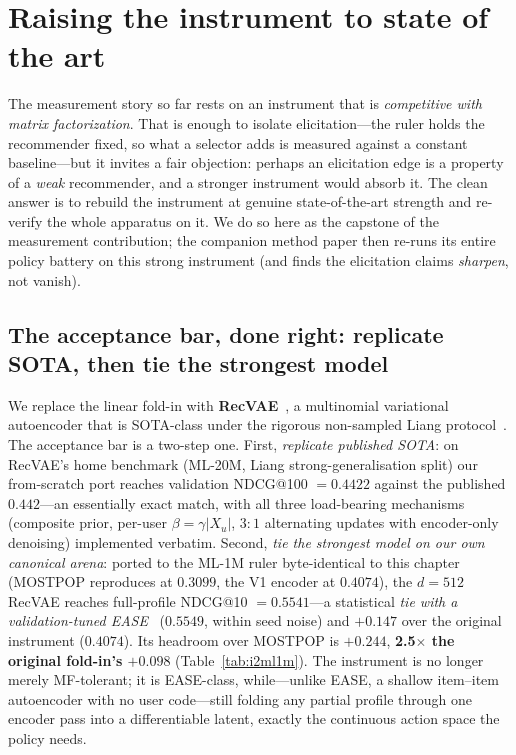 \documentclass[11pt]{article}
\begin{document}
\section{Raising the instrument to state of the art}\label{sec:i2}
The measurement story so far rests on an instrument that is \emph{competitive with matrix factorization}. That is enough
to isolate elicitation---the ruler holds the recommender fixed, so what a selector adds is measured against a constant
baseline---but it invites a fair objection: perhaps an elicitation edge is a property of a \emph{weak} recommender, and
a stronger instrument would absorb it. The clean answer is to rebuild the instrument at genuine state-of-the-art
strength and re-verify the whole apparatus on it. We do so here as the capstone of the measurement contribution; the
companion method paper then re-runs its entire policy battery on this strong instrument (and finds the elicitation
claims \emph{sharpen}, not vanish).

\subsection{The acceptance bar, done right: replicate SOTA, then tie the strongest model}\label{sec:i2accept}
We replace the linear fold-in with \textbf{RecVAE}~\cite{recvae}, a multinomial variational autoencoder that is
SOTA-class under the rigorous non-sampled Liang protocol~\cite{multvae18}. The acceptance bar is a two-step one. First,
\emph{replicate published SOTA}: on RecVAE's home benchmark (ML-20M, Liang strong-generalisation split) our from-scratch
port reaches validation NDCG@100 $= 0.4422$ against the published $0.442$---an essentially exact match, with all three
load-bearing mechanisms (composite prior, per-user $\beta=\gamma|X_u|$, $3{:}1$ alternating updates with encoder-only
denoising) implemented verbatim. Second, \emph{tie the strongest model on our own canonical arena}: ported to the
ML-1M ruler byte-identical to this chapter (MOSTPOP reproduces at $0.3099$, the V1 encoder at $0.4074$), the $d{=}512$
RecVAE reaches full-profile NDCG@10 $= 0.5541$---a statistical \emph{tie with a validation-tuned EASE}~\cite{ease}
($0.5549$, within seed noise) and $\mathbf{+0.147}$ over the original instrument ($0.4074$). Its headroom over MOSTPOP
is $+0.244$, \textbf{2.5$\times$ the original fold-in's $+0.098$} (Table~\ref{tab:i2ml1m}). The instrument is no longer
merely MF-tolerant; it is EASE-class, while---unlike EASE, a shallow item--item autoencoder with no user code---still
folding any partial profile through one encoder pass into a differentiable latent, exactly the continuous action space
the policy needs.
\end{document}

